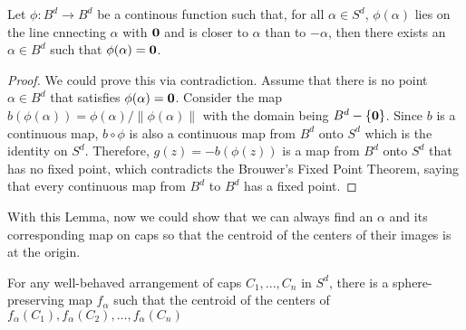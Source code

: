 \begin{lemma}
    Let $\phi: B^d \rightarrow B^d$ be a continous function such that, for all $\alpha \in S^d$, $\phi(\alpha)$ lies on the line cnnecting $\alpha$ with $\boldsymbol{\mathbf{0}}$ and is closer to $\alpha $ than to $-\alpha$, then there  exists an $\alpha \in B^d$ such that $\phi(\alpha)=\boldsymbol{\mathbf{0}}$.  
\end{lemma}\label{le:alpha_exists}
\begin{proof}
We could prove this via contradiction. Assume that there is no point $\alpha \in B^d$ that satisfies $\phi(\alpha)=\boldsymbol{\mathbf{0}}$. Consider the map $b(\phi(\alpha))=\phi(\alpha)/\|\phi(\alpha)\|$ with the domain being $B^d - \{\boldsymbol{\mathbf{0}}\}$. Since $b$ is a continuous map, $b \circ \phi$ is also a continuous map from $B^d$ onto $S^d$ which is the identity on $S^d$. Therefore, $g(z) = -b(\phi(z))$ is a map from $B^d$ onto $S^d$ that has no fixed point, which contradicts the Brouwer's Fixed Point Theorem, saying that every continuous map from $B^d$ to $B^d$ has a fixed point. 
\end{proof}

With this Lemma, now we could show that we can always find an $\alpha$ and its corresponding map on caps so that the centroid of the centers of their images is at the origin. 

\begin{theorem}
    For any well-behaved arrangement of caps ${C_1, ..., C_n}$ in $S^d$, there is a sphere-preserving map $f_\alpha$ such that the centroid of the centers of $f_\alpha(C_1),f_\alpha(C_2),...,f_\alpha(C_n)$
\end{theorem}\label{th:sum_is_origin}

